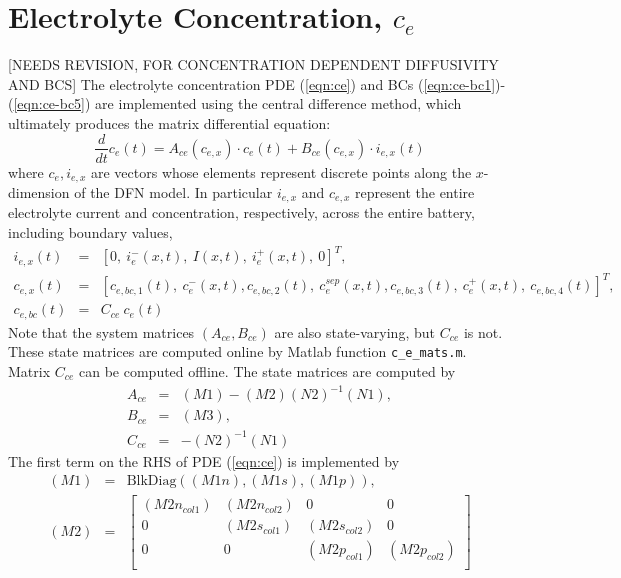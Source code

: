\documentclass[12pt]{article}
\newcommand{\red}[1]{{\color{red}#1}}
\begin{document}
\section{Electrolyte Concentration, $c_{e}$}\label{sec:ce}
\red{[NEEDS REVISION, FOR CONCENTRATION DEPENDENT DIFFUSIVITY AND BCS]} The electrolyte concentration PDE (\ref{eqn:ce}) and BCs (\ref{eqn:ce-bc1})-(\ref{eqn:ce-bc5}) are implemented using the central difference method, which ultimately produces the matrix differential equation:
\begin{equation}
	\frac{d}{dt} c_{e}(t) = A_{ce}(c_{e,x}) \cdot c_{e}(t) + B_{ce}(c_{e,x}) \cdot i_{e,x}(t)
\end{equation}
where $c_{e}, i_{e,x}$ are vectors whose elements represent discrete points along the $x$-dimension of the DFN model. In particular $i_{e,x}$ and $c_{e,x}$ represent the entire electrolyte current and concentration, respectively, across the entire battery, including boundary values,
\begin{eqnarray}
	i_{e,x}(t) &=& \left[0, \ i_{e}^{-}(x,t), \ I(x,t), \ i_{e}^{+}(x,t), \ 0 \right]^{T}, \label{eqn:iex} \\
	c_{e,x}(t) &=& \left[c_{e,bc,1}(t), \ c_{e}^{-}(x,t), c_{e,bc,2}(t), \ c_{e}^{sep}(x,t), c_{e,bc,3}(t), \ c_{e}^{+}(x,t), \ c_{e,bc,4}(t) \right]^{T}, \label{eqn:cex} \\ 
	c_{e,bc}(t) &=& C_{ce} \ c_{e}(t) 
\end{eqnarray}
Note that the system matrices $(A_{ce}, B_{ce})$ are also state-varying, but $C_{ce}$ is not. These state matrices are computed online by Matlab function \texttt{c\_e\_mats.m}. Matrix $C_{ce}$ can be computed offline. The state matrices are computed by
\begin{eqnarray}
	A_{ce} &=& (M1) - (M2) (N2)^{-1} (N1), \\ 
	B_{ce} &=& (M3), \\
	C_{ce} &=& - (N2)^{-1} (N1)
\end{eqnarray}
The first term on the RHS of PDE (\ref{eqn:ce}) is implemented by
\begin{eqnarray}
	(M1) &=& \textrm{BlkDiag}\left( (M1n), (M1s), (M1p) \right), \\
	(M2) &=&
\left[
\begin{array}{cccc}
 (M2n_{col1}) & (M2n_{col2}) & 0 & 0 \\
 0 & (M2s_{col1}) & (M2s_{col2}) & 0 \\
 0 & 0 & (M2p_{col1}) & (M2p_{col2}) \\
\end{array}
\right]
\end{eqnarray}
\end{document}
